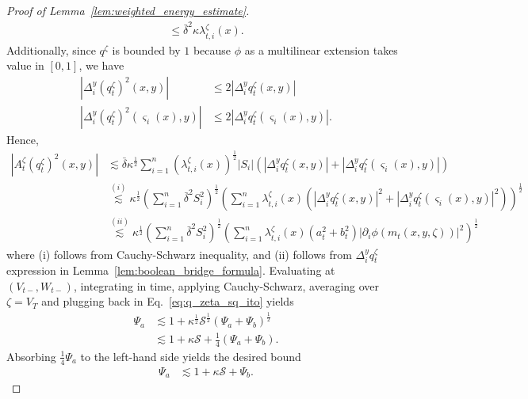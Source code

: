 \documentclass[10pt,a4paper]{amsart}
\newcommand{\abss}[1]{\left| #1 \right |}
\newcommand{\bdelta}{\bar{\delta}}
\newcommand{\btau}{\kappa}
\newcommand{\cS}{\mathcal{S}}
\newcommand{\flip}{\varsigma}
\newcommand{\parenth}[1]{\left( #1 \right)}
\newcommand{\uV}{V}
\newcommand{\uW}{W}
\begin{document}
\begin{proof}[Proof of Lemma~\ref{lem:weighted_energy_estimate}]
\begin{align*}
    \leq \bdelta^2 \btau  \lambda_{t, i}^{\zeta}(x).
  \end{align*}
  Additionally, since $q^{\zeta}$ is bounded by $1$ because $\phi$ as a multilinear extension takes value in $[0, 1]$, we have
  \begin{align*}
    \abss{\Delta_i^y (q_{t}^{\zeta})^2 (x, y)} &\leq 2 \abss{\Delta_i^y q_{t}^{\zeta} (x, y)} \\
    \abss{\Delta_i^y (q_{t}^{\zeta})^2 (\flip_i(x), y)} &\leq 2 \abss{\Delta_i^y q_{t}^{\zeta} (\flip_i(x), y)}.
  \end{align*}
  Hence,
  \begin{align*}
    \abss{A_t^{\zeta} (q_{t}^{\zeta})^2 (x, y)} &\lesssim \bdelta \btau^{\frac12} \sum_{i=1}^n \parenth{\lambda_{t, i}^{\zeta}(x)}^{\frac12} \abss{S_i} \parenth{\abss{\Delta_i^y q_{t}^{\zeta} (x, y)} + \abss{\Delta_i^y q_{t}^{\zeta} (\flip_i(x), y)}} \\
    &\overset{(i)}{\lesssim} \btau^{\frac12} \parenth{\sum_{i=1}^n \bdelta^2 S_i^2}^{\frac12} \parenth{\sum_{i=1}^n \lambda_{t, i}^{\zeta}(x) \parenth{\abss{\Delta_i^y q_{t}^{\zeta} (x, y)}^2 + \abss{\Delta_i^y q_{t}^{\zeta} (\flip_i(x), y)}^2}}^{\frac12} \\
    &\overset{(ii)}{\lesssim} \btau^{\frac12} \parenth{\sum_{i=1}^n \bdelta^2 S_i^2}^{\frac12} \parenth{\sum_{i=1}^n \lambda_{t, i}^{\zeta}(x) \parenth{a_t^2 + b_t^2}\abss{\partial_i \phi(m_t(x, y, \zeta))}^2 }^{\frac12}
  \end{align*}
  where (i) follows from Cauchy-Schwarz inequality, and (ii) follows from $\Delta_i^y q_{t}^{\zeta}$ expression in Lemma~\ref{lem:boolean_bridge_formula}. 
  Evaluating at $(\uV_{t-}, \uW_{t-})$, integrating in time, applying Cauchy-Schwarz, averaging over $\zeta = \uV_T$ and plugging back in Eq.~\eqref{eq:q_zeta_sq_ito} yields
  \begin{align*}
    \Psi_a &\lesssim 1 + \btau^{\frac12} \cS^{\frac12} \parenth{\Psi_a + \Psi_b}^{\frac12} \\
    &\lesssim 1 + \btau \cS + \frac14 (\Psi_a + \Psi_b).
  \end{align*}
  Absorbing $\frac14 \Psi_a$ to the left-hand side yields the desired bound
  \begin{align*}
    \Psi_a &\lesssim 1 + \btau \cS + \Psi_b.
  \end{align*}
\end{proof}
\end{document}
